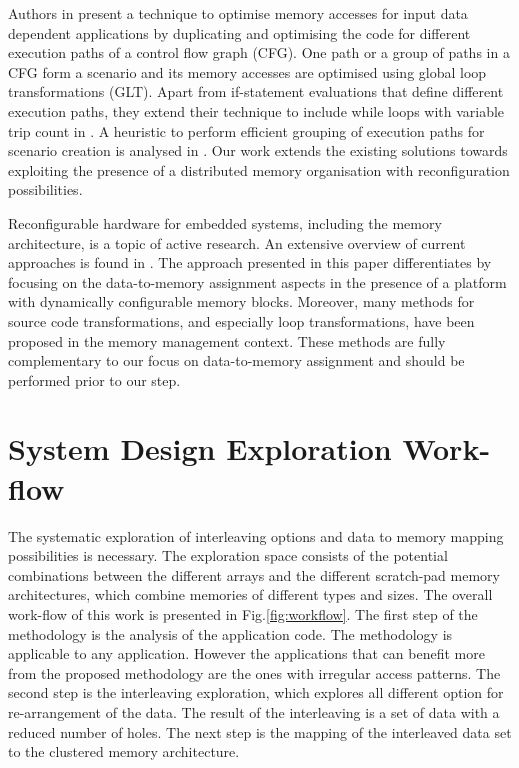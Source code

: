 \documentclass[prodmode,acmtodaes]{acmsmall}
\begin{document}
Authors in \cite{Pal06} present a technique to optimise memory accesses for input data dependent applications by duplicating and optimising the code for different execution paths of a control flow graph (CFG). 
One path or a group of paths in a CFG form a scenario and its memory accesses are optimised using global loop transformations (GLT). 
Apart from if-statement evaluations that define different execution paths, they extend their technique to include while loops with variable trip count in \cite{Pal06b}. 
A heuristic to perform efficient grouping of execution paths for scenario creation is analysed in \cite{Pal07}. 
Our work extends the existing solutions towards exploiting the presence of a distributed memory organisation with reconfiguration possibilities.

Reconfigurable hardware for embedded systems, including the memory architecture, is a topic of active research. 
An extensive overview of current approaches is found in \cite{Garcia}. 
The approach presented in this paper differentiates by focusing on the data-to-memory assignment aspects in the presence of a platform with dynamically configurable memory blocks. 
Moreover, many methods for source code transformations, and especially loop transformations, have been proposed in the memory management context. 
These methods are fully complementary to our focus on data-to-memory assignment and should be performed prior to our step. 

\section{System Design Exploration Work-flow}
\label{sec:methodology}

The systematic exploration of interleaving options and data to memory mapping possibilities is necessary.
The exploration space consists of the potential combinations between the different arrays and the different scratch-pad memory architectures, which combine memories of different types and sizes.
The overall work-flow of this work is presented in Fig.\ref{fig:workflow}. 
The first step of the methodology is the analysis of the application code. 
The methodology is applicable to any application.
However the applications that can benefit more from the proposed methodology are the ones with irregular access patterns.
The second step is the interleaving exploration, which explores all different option for re-arrangement of the data.
The result of the interleaving is a set of data with a reduced number of holes.
The next step is the mapping of the interleaved data set to the clustered memory architecture.
\end{document}
